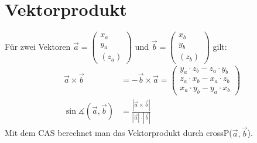 \section{Vektorprodukt}
Für zwei Vektoren
$\overrightarrow{a} = \left(\begin{array}{c} x_a \\ y_a \\ (z_a) \end{array} \right)$
und
$\overrightarrow{b} = \left(\begin{array}{c} x_b \\ y_b \\(z_b) \end{array}\right)$
gilt:
\begin{align}
  \overrightarrow{a} \times \overrightarrow{b}
  &= - \overrightarrow{b} \times \overrightarrow{a}
  = \left( \begin{array}{c}
    y_a \cdot z_b - z_a \cdot y_b \\
    z_a \cdot x_b - x_a \cdot z_b \\
    x_a \cdot y_b - y_a \cdot x_b
  \end{array} \right) \\
  \sin \measuredangle (\overrightarrow{a}, \overrightarrow{b})
  &= \frac{| \overrightarrow{a} \times \overrightarrow{b} |}
  {| \overrightarrow{a} | \cdot | \overrightarrow{b} |}
\end{align}
Mit dem CAS berechnet man das Vektorprodukt durch
\glqq crossP($\overrightarrow{a}, \overrightarrow{b}$)\grqq.
